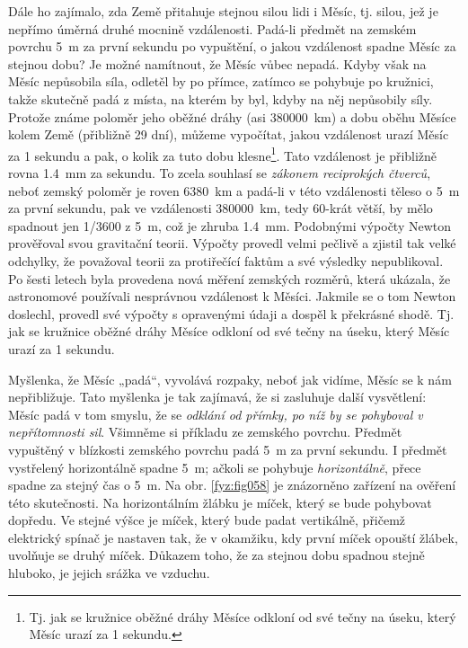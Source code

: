 {    Dále ho zajímalo, zda Země přitahuje stejnou silou lidi i Měsíc, tj. silou, jež je nepřímo 
    úměrná druhé mocnině vzdálenosti. Padá-li předmět na zemském povrchu \SI{5}{\m} za první 
    sekundu po vypuštění, o jakou vzdálenost spadne Měsíc za stejnou dobu? Je možné namítnout, že 
    Měsíc vůbec nepadá. Kdyby však na Měsíc nepůsobila síla, odletěl by po přímce, zatímco se 
    pohybuje po kružnici, takže skutečně padá z místa, na kterém by byl, kdyby na něj nepůsobily 
    síly. Protože známe poloměr jeho oběžné dráhy (asi \SI{380000}{\km}) a dobu oběhu Měsíce kolem 
    Země (přibližně \num{29} dní), můžeme vypočítat, jakou vzdálenost urazí Měsíc za \num{1} 
    sekundu a pak, o kolik za tuto dobu klesne\footnote{Tj. jak se kružnice oběžné dráhy Měsíce 
    odkloní od své tečny na úseku, který Měsíc urazí za 1 sekundu.}. Tato vzdálenost je přibližně 
    rovna \SI{1.4}{\mm} za sekundu. To zcela souhlasí se \emph{zákonem reciprokých čtverců}, neboť 
    zemský poloměr je roven \SI{6380}{\km} a padá-li v této vzdálenosti těleso o \SI{5}{\m} za 
    první sekundu, pak ve vzdálenosti \SI{380000}{\km}, tedy \num{60}-krát větší, by mělo spadnout 
    jen \num{1/3600} z \SI{5}{\m}, což je zhruba \SI{1.4}{\mm}. Podobnými výpočty Newton prověřoval 
    svou gravitační teorii. Výpočty provedl velmi pečlivě a zjistil tak velké odchylky, že 
    považoval teorii za protiřečící faktům a své výsledky nepublikoval. Po šesti letech byla 
    provedena nová měření zemských rozměrů, která ukázala, že astronomové používali nesprávnou 
    vzdálenost k Měsíci. Jakmile se o tom Newton doslechl, provedl své výpočty s opravenými údaji a 
    dospěl k překrásné shodě. Tj. jak se kružnice oběžné dráhy Měsíce odkloní od své tečny na 
    úseku, který Měsíc urazí za \num{1} sekundu.
    
    Myšlenka, že Měsíc „padá“, vyvolává rozpaky, neboť jak vidíme, Měsíc se k nám nepřibližuje. 
    Tato myšlenka je tak zajímavá, že si zasluhuje další vysvětlení: Měsíc padá v tom smyslu, že se 
    \emph{odklání od přímky, po níž by se pohyboval v nepřítomnosti sil}. Všimněme si příkladu ze 
    zemského povrchu. Předmět vypuštěný v blízkosti zemského povrchu padá \SI{5}{\m} za první 
    sekundu. I předmět vystřelený horizontálně spadne \SI{5}{\m}; ačkoli se pohybuje 
    \emph{horizontálně}, přece spadne za stejný čas o \SI{5}{\m}. Na obr. \ref{fyz:fig058} je 
    znázorněno zařízení na ověření této skutečnosti. Na horizontálním žlábku je míček, který se 
    bude pohybovat dopředu. Ve stejné výšce je míček, který bude padat vertikálně, přičemž 
    elektrický spínač je nastaven tak, že v okamžiku, kdy první míček opouští žlábek, uvolňuje se 
    druhý míček. Důkazem toho, že za stejnou dobu spadnou stejně hluboko, je jejich srážka ve 
    vzduchu.
    
}
